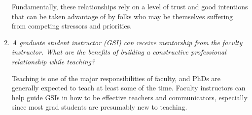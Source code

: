 \documentclass[12pt]{article}
\begin{document}
\begin{enumerate}
Fundamentally, these relationships rely on a level of trust and good intentions that can be taken advantage of by 
folks who may be themselves suffering from competing stressors and priorities.

\item \textit{A graduate student instructor (GSI) can receive mentorship from the faculty instructor. What are the benefits of building a constructive professional relationship while teaching?}

Teaching is one of the major responsibilities of faculty, and PhDs are generally expected to teach at least some
of the time. Faculty instructors can help guide GSIs in how to be effective teachers and communicators, especially
since most grad students are presumably new to teaching.
  
\end{enumerate}
\end{document}

